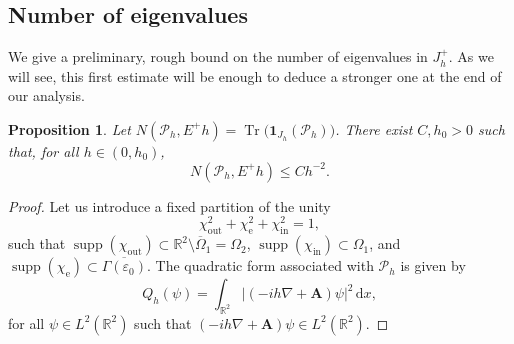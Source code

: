 \documentclass[10pt]{amsart}
\let\epsilon\varepsilon
\newcommand{\rd}{\,\mathrm{d}}
\newcommand{\rme}{\mathrm{e}}
\newcommand{\rin}{\mathrm{in}}
\newcommand{\out}{\mathrm{out}}
\DeclareMathOperator{\supp}{supp}
\DeclareMathOperator{\Tr}{Tr}
\newcommand{\cP}{\mathcal{P}}
\theoremstyle{plain}
\newtheorem{proposition}[theorem]{Proposition}
\theoremstyle{definition}
\newcommand{\A}{\boldsymbol{A}}
\newcommand{\R}{\mathbb{R}}
\begin{document}
\subsection{Number of eigenvalues}\label{sec.number}
We give a preliminary, rough bound on
the number of eigenvalues in $J^+_h$. As we will see, this first estimate will be enough to deduce a stronger one at the end of our analysis.
\begin{proposition}\label{prop:Nb-h}
Let $N(\cP_h, E^+h)=\Tr\bigl(\mathbf 1_{J_h}(\cP_h)\bigr)$. There exist $C,h_0>0$ such that, for all $h\in(0,h_0)$,
\[
N(\cP_h, E^+h)\leq C h^{-2}.
\]
\end{proposition}
\begin{proof}
Let us introduce a fixed partition of the unity
\[
\chi_{\out}^2+\chi_{\rme}^2+\chi_{\rin}^2=1,
\] 
such that $\supp(\chi_{\out})\subset\mathbb{R}^2\setminus\overline{\Omega}_1=\Omega_2$, $\supp(\chi_{\rin})\subset\Omega_1$, and ${\supp(\chi_{\rme})}\subset \overline{\Gamma(\epsilon_0)}$.
The quadratic form associated with $\cP_h$ is given by 
\[
Q_h(\psi)=\int_{\R^2}|(-ih\nabla+\A)\psi|^2\rd x,
\]
for all $\psi\in L^2(\R^2)$ such that $(-ih\nabla+\A)\psi\in L^2(\R^2)$.


\end{proof}
\end{document}
